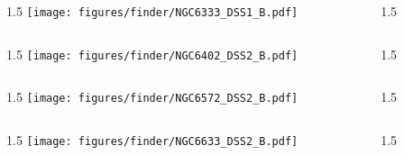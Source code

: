 \documentclass[final]{beamer}
\newlength{\colwidth}
\begin{document}

\begin{frame}[t]{}
  \begin{columns}[T]
    \begin{column}{1.5\colwidth}
      \centering
      \texttt{[image: figures/finder/NGC6333\_DSS1\_B.pdf]}
    \end{column}
    \begin{column}{1.5\colwidth}
      \Large
      
    \end{column}
  \end{columns}
  \vspace{\fill}
  \begin{columns}[T]
    \begin{column}{1.5\colwidth}
      \centering
      \texttt{[image: figures/finder/NGC6402\_DSS2\_B.pdf]}
    \end{column}
    \begin{column}{1.5\colwidth}
      \Large
      
    \end{column}
  \end{columns}
\end{frame}


\begin{frame}[t]{}
  \begin{columns}[T]
    \begin{column}{1.5\colwidth}
      \centering
      \texttt{[image: figures/finder/NGC6572\_DSS2\_B.pdf]}
    \end{column}
    \begin{column}{1.5\colwidth}
      \Large
      
    \end{column}
  \end{columns}
  \vspace{\fill}
  \begin{columns}[T]
    \begin{column}{1.5\colwidth}
      \centering
      \texttt{[image: figures/finder/NGC6633\_DSS2\_B.pdf]}
    \end{column}
    \begin{column}{1.5\colwidth}
      \Large
      
    \end{column}
  \end{columns}
\end{frame}
\end{document}
